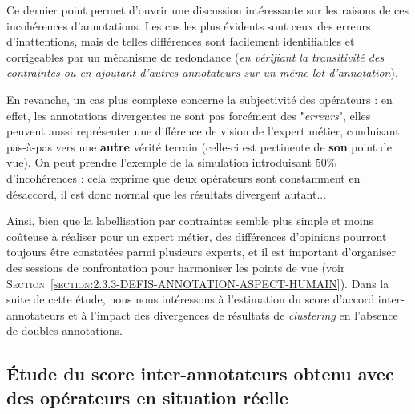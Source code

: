 			\begin{leftBarAuthorOpinion}
				Ce dernier point permet d'ouvrir une discussion intéressante sur les raisons de ces incohérences d'annotations.
				Les cas les plus évidents sont ceux des erreurs d’inattentions, mais de telles différences sont facilement identifiables et corrigeables par un mécanisme de redondance (\textit{en vérifiant la transitivité des contraintes ou en ajoutant d'autres annotateurs sur un même lot d'annotation}).
				
				En revanche, un cas plus complexe concerne la subjectivité des opérateurs :
				en effet, les annotations divergentes ne sont pas forcément des "\textit{erreurs}", elles peuvent aussi représenter une différence de vision de l'expert métier, conduisant pas-à-pas vers une \textbf{autre} vérité terrain (celle-ci est pertinente de \textbf{son} point de vue).
				On peut prendre l'exemple de la simulation introduisant $50$\% d'incohérences : cela exprime que deux opérateurs sont constamment en désaccord, il est donc normal que les résultats divergent autant...
				
				Ainsi, bien que la labellisation par contraintes semble plus simple et moins coûteuse à réaliser pour un expert métier, des différences d'opinions pourront toujours être constatées parmi plusieurs experts, et il est important d'organiser des sessions de confrontation pour harmoniser les points de vue (voir \textsc{Section~\ref{section:2.3.3-DEFIS-ANNOTATION-ASPECT-HUMAIN}}).
				Dans la suite de cette étude, nous nous intéressons à l'estimation du score d'accord inter-annotateurs et à l'impact des divergences de résultats de \textit{clustering} en l'absence de doubles annotations.
			\end{leftBarAuthorOpinion}
		
		
	\subsection{Étude du score inter-annotateurs obtenu avec des opérateurs en situation réelle}
	\label{section:4.6.2-ETUDE-ROBUSTESSE-SCORE-INTER-ANNOTATEURS}
		
